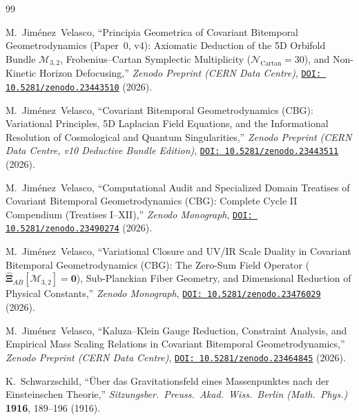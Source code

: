 \documentclass[11pt,a4paper]{article}
\theoremstyle{plain}
\theoremstyle{definition}
\theoremstyle{remark}
\numberwithin{equation}{section}
\begin{document}
\begin{thebibliography}{99}
\small
\setlength{\itemsep}{2pt}

M.~Jim\'enez~Velasco, ``Principia Geometrica of Covariant Bitemporal Geometrodynamics (Paper~0, v4): Axiomatic Deduction of the 5D Orbifold Bundle $\mathcal{M}_{3,2}$, Frobenius--Cartan Symplectic Multiplicity ($\mathcal{N}_{\text{Cartan}} = 30$), and Non-Kinetic Horizon Defocusing,'' \textit{Zenodo Preprint (CERN Data Centre)}, \href{https://doi.org/10.5281/zenodo.23443510}{\texttt{DOI: 10.5281/zenodo.23443510}} (2026).

M.~Jim\'enez~Velasco, ``Covariant Bitemporal Geometrodynamics (CBG): Variational Principles, 5D Laplacian Field Equations, and the Informational Resolution of Cosmological and Quantum Singularities,'' \textit{Zenodo Preprint (CERN Data Centre, v10 Deductive Bundle Edition)}, \href{https://doi.org/10.5281/zenodo.23443511}{\texttt{DOI: 10.5281/zenodo.23443511}} (2026).

M.~Jim\'enez~Velasco, ``Computational Audit and Specialized Domain Treatises of Covariant Bitemporal Geometrodynamics (CBG): Complete Cycle II Compendium (Treatises I--XII),'' \textit{Zenodo Monograph}, \href{https://doi.org/10.5281/zenodo.23490274}{\texttt{DOI: 10.5281/zenodo.23490274}} (2026).

M.~Jim\'enez~Velasco, ``Variational Closure and UV/IR Scale Duality in Covariant Bitemporal Geometrodynamics (CBG): The Zero-Sum Field Operator ($\widehat{\mathbf{\Xi}}_{AB}[\mathcal{M}_{3,2}] = \mathbf{0}$), Sub-Planckian Fiber Geometry, and Dimensional Reduction of Physical Constants,'' \textit{Zenodo Monograph}, \href{https://doi.org/10.5281/zenodo.23476029}{\texttt{DOI: 10.5281/zenodo.23476029}} (2026).

M.~Jim\'enez~Velasco, ``Kaluza--Klein Gauge Reduction, Constraint Analysis, and Empirical Mass Scaling Relations in Covariant Bitemporal Geometrodynamics,'' \textit{Zenodo Preprint (CERN Data Centre)}, \href{https://doi.org/10.5281/zenodo.23464845}{\texttt{DOI: 10.5281/zenodo.23464845}} (2026).

K.~Schwarzschild, ``\"Uber das Gravitationsfeld eines Massenpunktes nach der Einsteinschen Theorie,'' \textit{Sitzungsber.\ Preuss.\ Akad.\ Wiss.\ Berlin (Math.\ Phys.)} \textbf{1916}, 189--196 (1916).


\end{thebibliography}
\end{document}
